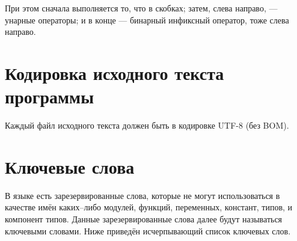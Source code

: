 \documentclass[10pt]{report}
\begin{document}
При этом сначала выполняется то, что в скобках; затем, слева направо, --- унарные операторы; и в конце --- бинарный инфиксный оператор, тоже слева направо.

\section{Кодировка исходного текста программы}
Каждый файл исходного текста должен быть в кодировке UTF-8 (без BOM).		
\section{Ключевые слова}
В языке есть зарезервированные слова, которые не могут использоваться в качестве имён каких--либо модулей, функций, переменных, констант, типов, и компонент типов. Данные зарезервированные слова далее будут называться ключевыми словами. Ниже приведён исчерпывающий список ключевых слов.
\end{document}

